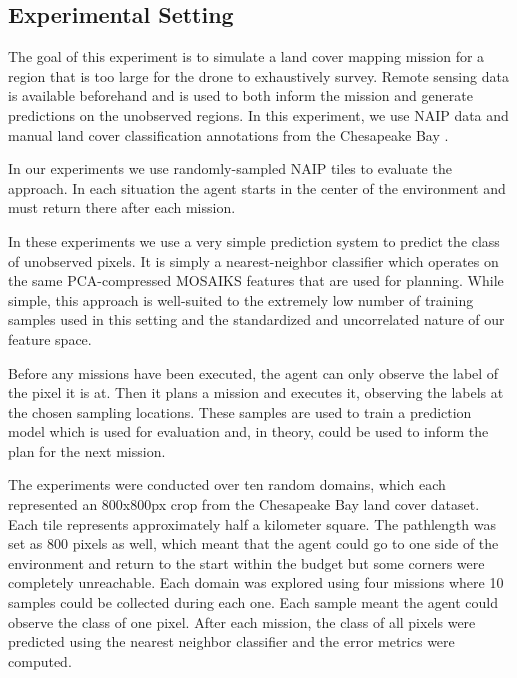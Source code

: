 \subsection{Experimental Setting}
The goal of this experiment is to simulate a land cover mapping mission for a region that is too large for the drone to exhaustively survey. Remote sensing data is available beforehand and is used to both inform the mission and generate predictions on the unobserved regions. In this experiment, we use NAIP data and manual land cover classification annotations from the Chesapeake Bay \cite{Claggett2014ChesapeakeProduction}.


In our experiments we use randomly-sampled NAIP tiles to evaluate the approach. In each situation the agent starts in the center of the environment and must return there after each mission.

In these experiments we use a very simple prediction system to predict the class of unobserved pixels. It is simply a nearest-neighbor classifier which operates on the same PCA-compressed MOSAIKS features that are used for planning. While simple, this approach is well-suited to the extremely low number of training samples used in this setting and the standardized and uncorrelated nature of our feature space.

Before any missions have been executed, the agent can only observe the label of the pixel it is at. Then it plans a mission and executes it, observing the labels at the chosen sampling locations. These samples are used to train a prediction model which is used for evaluation and, in theory, could be used to inform the plan for the next mission. 


The experiments were conducted over ten random domains, which each represented an 800x800px crop from the Chesapeake Bay land cover dataset. Each tile represents approximately half a kilometer square. The pathlength was set as 800 pixels as well, which meant that the agent could go to one side of the environment and return to the start within the budget but some corners were completely unreachable. Each domain was explored using four missions where 10 samples could be collected during each one. Each sample meant the agent could observe the class of one pixel. After each mission, the class of all pixels  were predicted using the nearest neighbor classifier and the error metrics were computed. 


